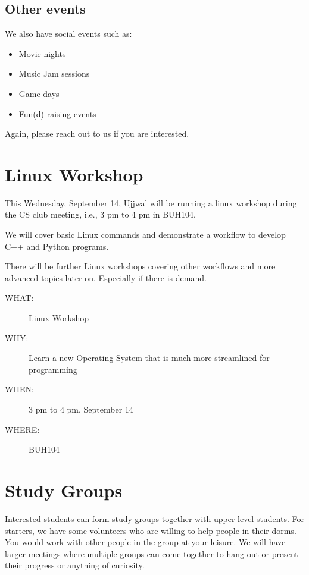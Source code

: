 \subsection{Other events}
\label{sec:orgheadline7}

We also have social events such as:
\begin{itemize}
\item Movie nights
\item Music Jam sessions
\item Game days
\item Fun(d) raising events
\end{itemize}

Again, please reach out to us if you are interested.


\section{Linux Workshop}
\label{sec:orgheadline9}

This Wednesday, September 14, Ujjwal will be running a linux workshop during
the CS club meeting, i.e., 3 pm to 4 pm in BUH104.

We will cover basic Linux commands and demonstrate a workflow to develop C++
and Python programs.

There will be further Linux workshops covering other workflows and more advanced
topics later on. Especially if there is demand.

\begin{description}
\item[{WHAT:}] Linux Workshop
\item[{WHY:}] Learn a new Operating System that is much more streamlined for programming
\item[{WHEN:}] 3 pm to 4 pm, September 14
\item[{WHERE:}] BUH104
\end{description}


\section{Study Groups}
\label{sec:orgheadline10}

Interested students can form study groups together with upper level
students. For starters, we have some volunteers who are willing to help people
in their dorms. You would work with other people in the group at your
leisure. We will have larger meetings where multiple groups can come together
to hang out or present their progress or anything of curiosity.

